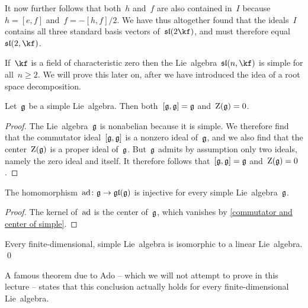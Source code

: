 \begin{examples}
\begin{enumerate}
      It now further follows that both~$h$ and~$f$ are also contained in~$I$ because~$h = [e,f]$ and~$f = -[h,f]/2$.
      We have thus altogether found that the ideals~$I$ contains all three standard basis vectors of~$\sllie(2 \kf)$, and must therefore equal~$\sllie(2, \kf)$.
  \end{enumerate}
\end{examples}


\begin{remark}
  If~$\kf$ is a field of characteristic zero then the Lie~algebra~$\sllie(n, \kf)$ is simple for all~$n \geq 2$.
  We will prove this later on, after we have introduced the idea of a root space decomposition.
\end{remark}


\begin{proposition}
  \label{commutator and center of simple}
  Let~$\mathfrak{g}$ be a simple Lie~algebra.
  Then both~$[\mathfrak{g}, \mathfrak{g}] = \mathfrak{g}$ and~$\operatorname{Z}(\mathfrak{g}) = 0$.
\end{proposition}


\begin{proof}
  The Lie~algebra~$\mathfrak{g}$ is nonabelian because it is simple.
  We therefore find that the commutator ideal~$[\mathfrak{g}, \mathfrak{g}]$ is a nonzero ideal of~$\mathfrak{g}$, and we also find that the center~$\operatorname{Z}(\mathfrak{g})$ is a proper ideal of~$\mathfrak{g}$.
  But~$\mathfrak{g}$ admits by assumption only two ideals, namely the zero ideal and itself.
  It therefore follows that~$[\mathfrak{g}, \mathfrak{g}] = \mathfrak{g}$ and~$\operatorname{Z}(\mathfrak{g}) = 0$.
\end{proof}


\begin{corollary}
  \label{ad is injective for simple}
  The homomorphism~$\ad \colon \glie \to \gllie(\glie)$ is injective for every simple Lie~algebra~$\mathfrak{g}$.
\end{corollary}


\begin{proof}
  The kernel of~$\operatorname{ad}$ is the center of~$\mathfrak{g}$, which vanishes by \cref{commutator and center of simple}.
\end{proof}


\begin{corollary}
  Every finite-dimensional, simple Lie~algebra is isomorphic to a linear Lie~algebra.
  \qed
\end{corollary}


\begin{fluff}
  A famous theorem due to Ado -- which we will not attempt to prove in this lecture -- states that this conclusion actually holds for every finite-dimensional Lie~algebra.
\end{fluff}


